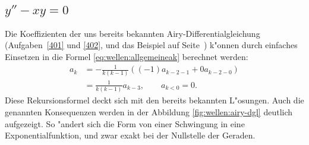 \subsection{\texorpdfstring{$y''-xy = 0$}{y''-xy = 0}}
Die Koeffizienten der uns bereits bekannten Airy-Differentialgleichung
(Aufgaben~\ref{401} und \ref{402}, und das Beispiel auf
Seite~\pageref{komplex:airydgl})
k"onnen 
durch einfaches Einsetzen in die Formel \eqref{eq:wellen:allgemeineak} 
berechnet werden:
\begin{equation*}
	\begin{split}
		a_k &= -\frac{1}{k(k-1)} ((-1) a_{k-2-1} + 
		0 a_{k-2-0})
		\\
		&= \frac{1}{k(k-1)} a_{k-3}, \qquad a_{k < 0} = 0.
	\end{split}
\end{equation*}
Diese Rekursionsformel deckt sich mit den bereits bekannten L"osungen.
Auch die genannten Konsequenzen werden in der Abbildung 
\ref{fig:wellen:airy-dgl} deutlich aufgezeigt. So "andert sich die Form von 
einer Schwingung in eine Exponentialfunktion, und zwar exakt bei der Nullstelle 
der Geraden.

